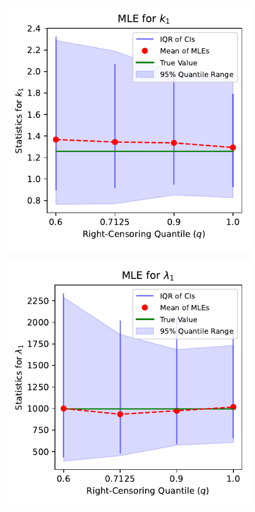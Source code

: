\documentclass{article}
\begin{document}
\pagestyle{empty}

\noindent
\begin{minipage}[t]{0.45\textwidth}
  \centering
  \includegraphics[width=\textwidth,height=0.33\textheight,keepaspectratio]{plot-q-vs-shape.1.pdf}
\end{minipage}%
\hspace{0.05\textwidth} %
\begin{minipage}[t]{0.45\textwidth}
  \centering
  \includegraphics[width=\textwidth,height=0.33\textheight,keepaspectratio]{plot-q-vs-scale.1.pdf}
\end{minipage}
\end{document}
